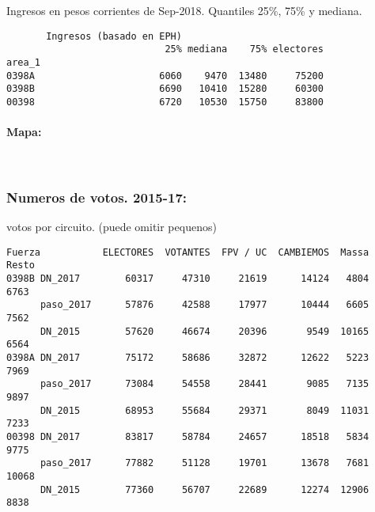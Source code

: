 \documentclass[11pt]{article}
\begin{document}
    
    Ingresos en pesos corrientes de Sep-2018. Quantiles 25\%, 75\% y
mediana.

    
    
    \begin{verbatim}
       Ingresos (basado en EPH)                         
                            25% mediana    75% electores
area_1                                                  
0398A                      6060    9470  13480     75200
0398B                      6690   10410  15280     60300
00398                      6720   10530  15750     83800
    \end{verbatim}

    
    \hypertarget{mapa}{%
\paragraph{Mapa:}\label{mapa}}

    
    \begin{center}
    \end{center}
    { \hspace*{\fill} \\}
    
    \hypertarget{numeros-de-votos.-2015-17}{%
\subsubsection{Numeros de votos.
2015-17:}\label{numeros-de-votos.-2015-17}}

    
    votos por circuito. (puede omitir pequenos)

    
    
    \begin{verbatim}
Fuerza           ELECTORES  VOTANTES  FPV / UC  CAMBIEMOS  Massa  Resto
0398B DN_2017        60317     47310     21619      14124   4804   6763
      paso_2017      57876     42588     17977      10444   6605   7562
      DN_2015        57620     46674     20396       9549  10165   6564
0398A DN_2017        75172     58686     32872      12622   5223   7969
      paso_2017      73084     54558     28441       9085   7135   9897
      DN_2015        68953     55684     29371       8049  11031   7233
00398 DN_2017        83817     58784     24657      18518   5834   9775
      paso_2017      77882     51128     19701      13678   7681  10068
      DN_2015        77360     56707     22689      12274  12906   8838
    \end{verbatim}
\end{document}
